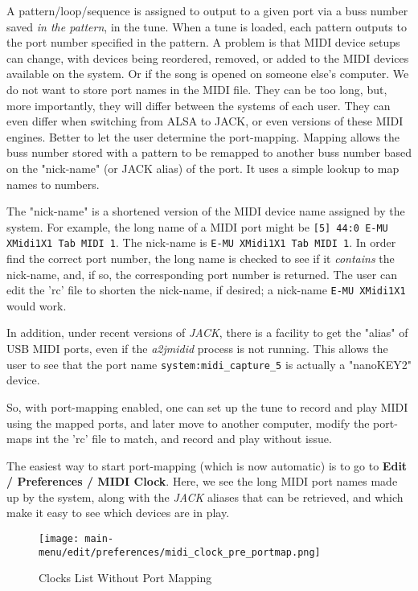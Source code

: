   A pattern/loop/sequence is assigned to output to a given port via
   a buss number saved \textsl{in the pattern}, in the tune.
   When a tune is loaded,
   each pattern outputs to the port number specified in the pattern.
   A problem is that MIDI device setups can change, with devices being
   reordered, removed, or added to the MIDI devices available on the system.
   Or if the song is opened on someone else's computer.
   We do not want to store port names in the MIDI file.
   They can be too long, but, more importantly,
   they will differ between the systems of each user.
   They can even differ when switching from ALSA to JACK, or even versions
   of these MIDI engines.
   Better to let the user determine the port-mapping.
   Mapping allows the buss number stored with a pattern to be
   remapped to another buss number based on the "nick-name"
   (or JACK alias) of the port.
   It uses a simple lookup to map names to numbers.

   The "nick-name" is a shortened version of the MIDI device name assigned
   by the system.
   For example, the long name of a MIDI port might be
   \texttt{[5] 44:0 E-MU XMidi1X1 Tab MIDI 1}.
   The nick-name is \texttt{E-MU XMidi1X1 Tab MIDI 1}.
   In order find the correct port number, the long name is checked to see if it
   \textsl{contains} the nick-name, and, if so, the corresponding port number is
   returned.  The user can edit the 'rc' file to shorten the nick-name, if
   desired; a nick-name \texttt{E-MU XMidi1X1} would work.

   In addition, under recent versions of \textsl{JACK},
   there is a facility to get the "alias" of USB MIDI ports,
   even if the \textsl{a2jmidid} process is not running.
   This allows the user to see that the port name
   \texttt{system:midi\_capture\_5} is actually a "nanoKEY2" device.

   So, with port-mapping enabled, one can set up the tune to record and play
   MIDI using the mapped ports, and later move to another computer, modify the
   port-maps int the 'rc' file to match, and record and play without issue.

   The easiest way to start port-mapping (which is now automatic) is to go to
   \textbf{Edit / Preferences / MIDI Clock}.
   Here, we see the long MIDI port names made up by the system, along
   with the \textsl{JACK} aliases that can be retrieved, and which make it easy
   to see which devices are in play.

\begin{figure}[H]
   \centering 
   \texttt{[image: main-menu/edit/preferences/midi\_clock\_pre\_portmap.png]}
   \caption{Clocks List Without Port Mapping}
   \label{fig:clocks_list_before_port_mapping}
\end{figure}

